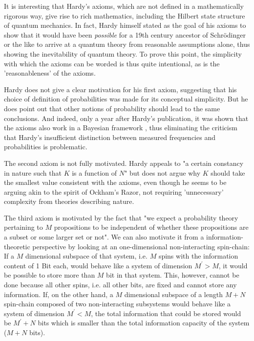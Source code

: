 \documentclass[11pt, a4paper]{article}
\begin{document}
\vspace{8pt}
It is interesting that Hardy's axioms, which are not defined in a mathematically rigorous way, give rise to rich mathematics, including the Hilbert state structure of quantum mechanics. In fact, Hardy himself stated as the goal of his axioms to show that it would have been \emph{possible} for a 19th century ancestor of Schrödinger or the like to arrive at a quantum theory from reasonable assumptions alone, thus showing the inevitability of quantum theory. To prove this point, the simplicity with which the axioms can be worded is thus quite intentional, as is the 'reasonableness' of the axioms.\par
Hardy does not give a clear motivation for his first axiom, suggesting that his choice of definition of probabilities was made for its conceptual simplicity. But he does point out that other notions of probability should lead to the same conclusions. And indeed, only a year after Hardy's publication, it was shown that the axioms also work in a Bayesian framework \cite{Schack_2003}, thus eliminating the criticism that Hardy's insufficient distinction between measured frequencies and probabilities is problematic.\par
The second axiom is not fully motivated. Hardy appeals to "a certain constancy in nature such that $K$ is a function of $N$" but does not argue why $K$ should take the smallest value consistent with the axioms, even though he seems to be arguing akin to the spirit of Ockham's Razor, not requiring 'unnecessary' complexity from theories describing nature.\par
The third axiom is motivated by the fact that "we expect a probability theory pertaining to $M$ propositions to be independent of whether these propositions are a subset or some larger set or not". We can also motivate it from a information-theoretic perspective by looking at an one-dimensional non-interacting spin-chain: If a $M$ dimensional subspace of that system, i.e. $M$ spins with the information content of 1 Bit each, would behave like a system of dimension $M^\prime >M$, it would be possible to store more than $M$ bit in that system. This, however, cannot be done because all other spins, i.e. all other bits, are fixed and cannot store any information. If, on the other hand, a $M$ dimensional subspace of a length $M+N$ spin-chain composed of two non-interacting subsystems would behave like a system of dimension $M^\prime < M$, the total information that could be stored would be $M^\prime+N$ bits which is smaller than the total information capacity of the system ($M+N$ bits).\par
\end{document}
